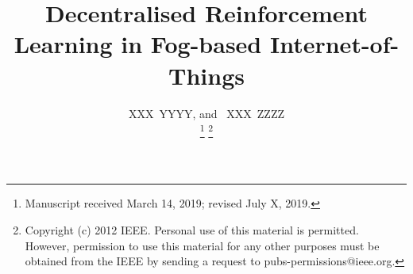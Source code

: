\documentclass[journal]{IEEEtran}
\begin{document}
%
\title{Decentralised Reinforcement Learning in Fog-based Internet-of-Things}
%
%
%

\author{XXX~YYYY,
        and~ XXX~ZZZZ%

\thanks{Manuscript received March 14, 2019; revised July X, 2019.}
\thanks{Copyright (c) 2012 IEEE. Personal use of this material is permitted. However, permission to use this material for any other purposes must be obtained from the IEEE by sending a request to pubs-permissions@ieee.org.}
}

%
%
\end{document}
